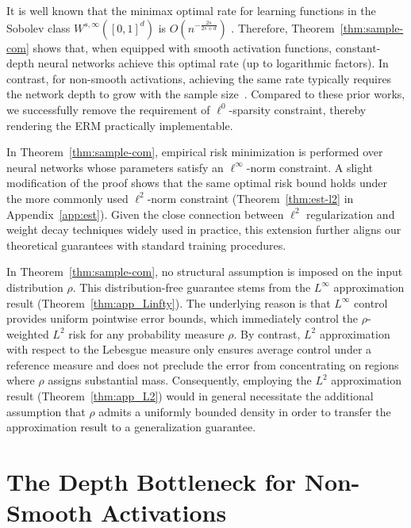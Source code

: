 \documentclass[11pt]{article}
\begin{document}
It is well known that the minimax optimal rate 
for learning functions in the Sobolev class 
$W^{s,\infty}([0,1]^d)$ 
is $O(n^{-\frac{2s}{2s+d}})$ 
\citep{stone1982optimal,tsybakov2009introduction}. Therefore,
Theorem~\ref{thm:sample-com} shows that, 
when equipped with smooth activation functions, 
constant-depth neural networks achieve this optimal rate 
(up to logarithmic factors). In contrast, for non-smooth activations,  achieving the same rate typically requires the network depth  to grow with the sample size~\citep{schmidt2020nonparametric,suzukiadaptivity,ohn2019smooth}. Compared to these prior works, we successfully remove the requirement of $\ell^0$-sparsity constraint, thereby rendering the ERM practically implementable.

In Theorem~\ref{thm:sample-com}, empirical risk minimization is performed over neural networks whose parameters satisfy an $\ell^\infty$-norm constraint. A slight modification of the proof shows that the same optimal risk bound holds under the more commonly used $\ell^2$-norm constraint (Theorem~\ref{thm:est-l2} in Appendix~\ref{app:est}). Given the close connection between $\ell^2$ regularization and weight decay techniques widely used in practice, this extension further aligns our theoretical guarantees with standard training procedures.

\begin{remark}
In Theorem~\ref{thm:sample-com}, no structural assumption is imposed on the input distribution $\rho$. 
This distribution-free guarantee stems from the $L^\infty$ approximation result (Theorem~\ref{thm:app_Linfty}). 
The underlying reason is that $L^\infty$ control provides uniform pointwise error bounds, which immediately control the $\rho$-weighted $L^2$ risk for any probability measure $\rho$. 
By contrast, $L^2$ approximation with respect to the Lebesgue measure only ensures average control under a reference measure and does not preclude the error from concentrating on regions where $\rho$ assigns substantial mass. 
Consequently, employing the $L^2$ approximation result (Theorem~\ref{thm:app_L2}) would in general necessitate the additional assumption that $\rho$ admits a uniformly bounded density in order to transfer the approximation result to a generalization guarantee.
\end{remark}


\section{The Depth Bottleneck for Non-Smooth Activations}
\label{sec:separation}
\end{document}
